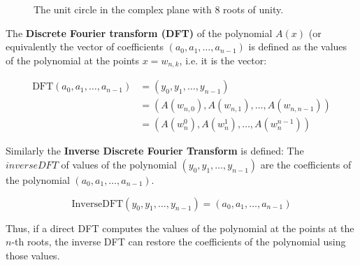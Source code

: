 \documentclass[12pt]{article}
\theoremstyle{definition}
\begin{document}
\begin{figure}[h!]
\centering
{}
\caption{The unit circle in the complex plane with 8 roots of unity.}
\label{fig:unit-circle}
\end{figure}

The \textbf{Discrete Fourier transform (DFT)} of the polynomial $A(x)$ (or equivalently the vector of coefficients $(a_0, a_1, \dots, a_{n-1})$ is defined as the values of the polynomial at the points $x = w_{n, k}$, i.e. it is the vector:


\begin{align}
\text{DFT}(a_0, a_1, \dots, a_{n-1}) &= (y_0, y_1, \dots, y_{n-1}) \\
&= (A(w_{n, 0}), A(w_{n, 1}), \dots, A(w_{n, n-1})) \\
&= (A(w_n^0), A(w_n^1), \dots, A(w_n^{n-1}))
\end{align}

Similarly the \textbf{Inverse Discrete Fourier Transform} is defined:
The $inverse DFT$ of values of the polynomial $(y_0, y_1, \dots, y_{n-1})$ are the coefficients of the polynomial $(a_0, a_1, \dots, a_{n-1})$.

$$\text{InverseDFT}(y_0, y_1, \dots, y_{n-1}) = (a_0, a_1, \dots, a_{n-1})$$

Thus, if a direct DFT computes the values of the polynomial at the points at the $n$-th roots, the inverse DFT can restore the coefficients of the polynomial using those values.
\end{document}
